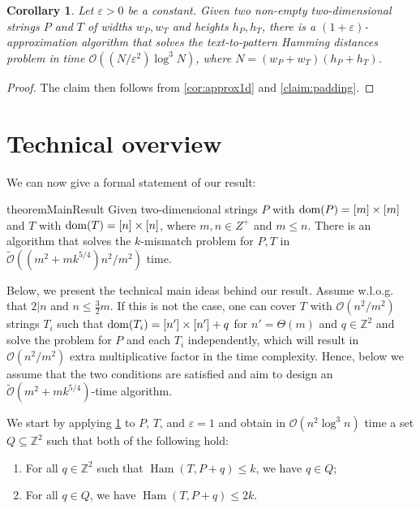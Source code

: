 \documentclass[11pt, letterpaper]{article}
\theoremstyle{plain}
\newtheorem{corollary}[fact]{Corollary}
\theoremstyle{definition}
\theoremstyle{remark}
\newcommand{\Z}{\mathbb{Z}}
\renewcommand{\O}{\mathcal{O}}
\newcommand{\tO}{\tilde{\mathcal{O}}}
\DeclareMathOperator*{\Ham}{Ham}
\begin{document}
\begin{corollary}\label{cor:approx2d}
Let $\varepsilon > 0$ be a constant. Given two non-empty two-dimensional strings $P$ and $T$ of widths $w_P, w_T$ and heights $h_P, h_T$, there is a $(1+\varepsilon)$-approximation algorithm that solves the text-to-pattern Hamming distances problem in time $\O((N/\varepsilon^2)  \log^3 N)$, where $N = (w_P + w_T)(h_P + h_T)$.
\end{corollary}
\begin{proof}
The claim then follows from \cref{cor:approx1d} and \cref{claim:padding}. 
\end{proof}


\section{Technical overview}
We can now give a formal statement of our result:

\begin{restatable}{theorem}{MainResult}\label{th:main}
Given two-dimensional strings $P$ with $\operatorname*{dom}(P) = [m] \times [m]$ and $T$ with $\operatorname*{dom}(T) = [n] \times [n]$, where $m,n\in Z^+$ and $m \le n$. There is an algorithm that solves the $k$-mismatch problem for $P,T$ in $\tO((m^2 + mk^{5/4})n^2 / m^2)$ time.
\end{restatable}

Below, we present the technical main ideas behind our result. Assume w.l.o.g. that $2|n$ and $n \le \frac{3}{2}m$. If this is not the case, one can cover $T$ with $\O(n^2/m^2)$ strings $T_i$ such that $\operatorname*{dom}(T_i) = [n'] \times [n'] + q$ for $n' = \Theta(m)$ and $q \in \Z^2$ and solve the problem for $P$ and each $T_i$ independently, which will result in $\O(n^2/m^2)$ extra multiplicative factor in the time complexity. Hence, below we assume that the two conditions are satisfied and aim to design an $\tO(m^2 + mk^{5/4})$-time algorithm. 

We start by applying \cref{cor:approx2d} to $P$, $T$, and $\varepsilon = 1$ and obtain in $\O(n^2 \log^3 n)$ time a set $Q \subseteq \Z^2$ such that both of the following hold:
\begin{enumerate}
\item For all $q \in \Z^2$ such that $\Ham(T, P+q) \le k$, we have $q \in Q$;
\item For all $q \in Q$, we have $\Ham(T, P+q) \le 2 k$.
\end{enumerate}
\end{document}

